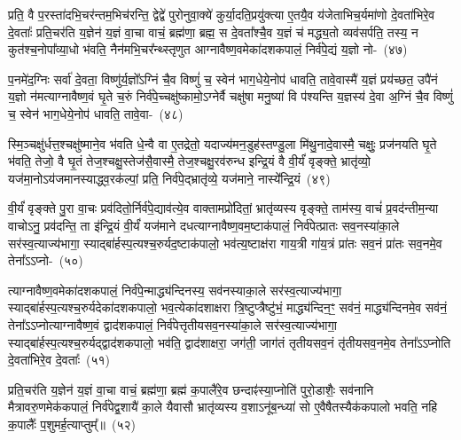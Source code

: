 प्रति॒ वै प॒रस्ता॑दभि॒चर॑न्तम॒भिच॑रन्ति॒ द्वेद्वे॑ पुरोनुवा॒क्ये॑ कुर्या॒दति॒प्रयु॑क्त्या ए॒तयै॒व य॑जेताभिच॒र्यमा॑णो दे॒वता॑भिरे॒व दे॒वताः᳚ प्रति॒चर॑ति य॒ज्ञेन॑ य॒ज्ञं वा॒चा वाचं॒ ब्रह्म॑णा॒ ब्रह्म॒ स दे॒वता᳚श्चै॒व य॒ज्ञं च॑ मद्ध्य॒तो व्यव॑सर्पति॒ तस्य॒ न कुत॑श्च॒नोपा᳚व्या॒धो भ॑वति॒ नैन॑मभि॒चर᳚न्थ्स्तृणुत आग्नावैष्ण॒वमेका॑\-दश\-कपालं॒ निर्व॑पे॒द्यं य॒ज्ञो नो-~(४७)\ip

प॒नमे॑द॒ग्निः सर्वा॑ दे॒वता॒ विष्णु॑र्य॒ज्ञो᳚\-ऽग्निं चै॒व विष्णुं॑ च॒ स्वेन॑ भाग॒\-धेये॒नोप॑ धावति॒ तावे॒वास्मै॑ य॒ज्ञं प्रय॑च्छत॒ उपै॑नं य॒ज्ञो न॑मत्याग्नावैष्ण॒वं घृ॒ते च॒रुं निर्व॑पे॒च्चक्षु॑ष्कामो॒\-ऽग्नेर्वै चक्षु॑षा मनु॒ष्या॑ वि प॑श्यन्ति य॒ज्ञस्य॑ दे॒वा अ॒ग्निं चै॒व विष्णुं॑ च॒ स्वेन॑ भाग॒\-धेये॒नोप॑ धावति॒ तावे॒वा-~(४८)\ip

स्मि॒ञ्चक्षु॑र्धत्त॒श्चक्षु॑ष्माने॒व भ॑वति धे॒न्वै वा ए॒तद्रेतो॒ यदाज्य॑मन॒डुह॑स्तण्डु॒ला मि॑थु॒नादे॒वास्मै॒ चक्षुः॒ प्रज॑नयति घृ॒ते भ॑वति॒ तेजो॒ वै घृ॒तं तेज॒श्चक्षु॒स्तेज॑सै॒वास्मै॒ तेज॒श्चक्षु॒रव॑रुन्ध इन्द्रि॒यं वै वी॒र्यं॑ वृङ्क्ते॒ भ्रातृ॑व्यो॒ यज॑मा॒नो\-ऽय॑जमानस्याद्ध्व॒रक॑ल्पां॒ प्रति॒ निर्व॑पे॒द्भ्रातृ॑व्ये॒ यज॑माने॒ नास्ये᳚न्द्रि॒यं~(४९)\ip

वी॒र्यं॑ वृङ्क्ते पु॒रा वा॒चः प्रव॑दितो॒र्निर्व॑पे॒द्याव॑त्ये॒व वाक्तामप्रो॑दितां॒ भ्रातृ॑व्यस्य वृङ्क्ते॒ ताम॑स्य॒ वाचं॑ प्र॒वद॑न्तीम॒न्या वाचो\-ऽनु॒ प्रव॑दन्ति॒ ता इ॑न्द्रि॒यं वी॒र्यं॑ यज॑माने दधत्याग्ना\-वैष्ण॒व\-म॒ष्टा\-क॑पालं॒ निर्व॑पेत्प्रातः सव॒नस्या॑का॒ले सर॑स्व॒त्याज्य॑भागा॒ स्याद्बा॑र्\mbox{}हस्प॒त्यश्च॒रुर्यद॒ष्टाक॑पालो॒ भव॑त्य॒ष्टाक्ष॑रा गाय॒त्री गा॑य॒त्रं प्रा॑तः सव॒नं प्रा॑तः सव॒नमे॒व तेना᳚\-ऽऽ\-प्नो-~(५०)\ip

त्याग्नावैष्ण॒वमेका॑\-दश\-कपालं॒ निर्व॑पे॒न्माद्ध्य॑न्दिनस्य॒ सव॑नस्या\-का॒ले सर॑स्व॒त्याज्य॑भागा॒ स्याद्बा॑र्\mbox{}हस्प॒त्यश्च॒रुर्यदेका॑\-दश\-कपालो॒ भव॒त्येका॑\-दशाक्षरा त्रि॒ष्टुप्त्रैष्टु॑भं॒ माद्ध्य॑न्दिन॒ꣳ॒ सव॑नं॒ माद्ध्य॑न्दिनमे॒व सव॑नं॒ तेना᳚\-ऽऽ\-प्नोत्याग्नावैष्ण॒वं द्वाद॑श\-कपालं॒ निर्व॑पेत्तृतीय\-सव॒नस्या॑\-का॒ले सर॑स्व॒त्याज्य॑भागा॒ स्याद्बा॑र्\mbox{}ह\-स्प॒त्यश्च॒रुर्यद्द्वाद॑श\-कपालो॒ भव॑ति॒ द्वाद॑शाक्षरा॒ जग॑ती॒ जाग॑तं तृतीय\-सव॒नं तृ॑तीय\-सव॒नमे॒व तेना᳚\-ऽऽ\-प्नोति दे॒वता॑भिरे॒व दे॒वताः᳚~(५१)\ip

प्रति॒चर॑ति य॒ज्ञेन॑ य॒ज्ञं वा॒चा वाचं॒ ब्रह्म॑णा॒ ब्रह्म॑ क॒पालै॑रे॒व छन्दाꣴ॑स्या॒प्नोति॑ पुरो॒डाशैः॒ सव॑नानि मैत्रावरु॒णमेक॑कपालं॒ निर्व॑पेद्व॒शायै॑ का॒ले यैवासौ भ्रातृ॑व्यस्य व॒शा\-ऽनू॑ब॒न्ध्या॑ सो ए॒वैषैतस्यैक॑कपालो भवति॒ नहि क॒पालैः᳚ प॒शुमर्\mbox{}ह॒त्याप्तुम्᳚॥~(५२)\ip

{\anuvakamend[{ब्रह्म॑णै॒वैन॑म॒भिच॑रति य॒ज्ञो न तावे॒वास्ये᳚न्द्रि॒यमा᳚प्नोति दे॒वताः᳚ स॒प्तत्रिꣳ॑शच्च।}]}

